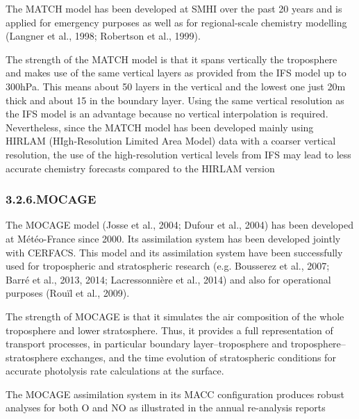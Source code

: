 \documentclass[9pt]{report}
\begin{document}
\noindent{}The MATCH model has been developed at SMHI over the past 20 years and is applied for emergency purposes as well as for regional-scale chemistry modelling (Langner et al., 1998; Robertson et al., 1999).%

The strength of the MATCH model is that it spans vertically the troposphere and makes use of the same vertical layers as provided from the IFS model up to 300hPa. This means about 50 layers in the vertical and the lowest one just 20m thick and about 15 in the boundary layer. 
Using the same vertical resolution as the IFS model is an advantage because no vertical interpolation is required. 
Nevertheless, since the MATCH model has been developed mainly using HIRLAM (HIgh-Resolution Limited Area Model) data with a coarser vertical resolution, the use of the high-resolution vertical levels from IFS may lead to less accurate chemistry forecasts compared to the HIRLAM version%

\subsubsection{3.2.6.\hspace*{0.5em}MOCAGE}\label{sec-mocage}%

\noindent{}The MOCAGE model (Josse et al., 2004; Dufour et al., 2004) has been developed at Météo-France since 2000. 
Its assimilation system has been developed jointly with CERFACS. 
This model and its assimilation system have been successfully used for tropospheric and stratospheric research (e.g. Bousserez et al., 2007; Barré et al., 2013, 2014; Lacressonnière et al., 2014) and also for operational purposes (Rouïl et al., 2009).%

The strength of MOCAGE is that it simulates the air composition of the whole troposphere and lower stratosphere. 
Thus, it provides a full representation of transport processes, in particular boundary layer–troposphere and troposphere–stratosphere exchanges, and the time evolution of stratospheric conditions for accurate photolysis rate calculations at the surface.%

The MOCAGE assimilation system in its MACC conﬁguration produces robust analyses for both O and NO as illustrated in the annual re-analysis reports %
\end{document}
